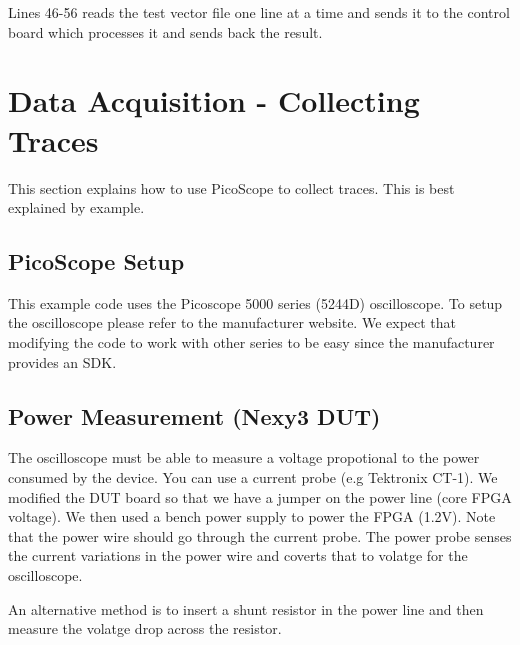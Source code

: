 \documentclass[letterpaper,10pt,english]{sphinxmanual}
\begin{document}
Lines 46-56 reads the test vector file one line at a time and sends it to the control board which processes it and sends back the result.


\chapter{Data Acquisition - Collecting Traces}
\label{\detokenize{capture_scope:data-acquisition-collecting-traces}}\label{\detokenize{capture_scope::doc}}
This section explains how to use PicoScope to collect traces. This is best explained by example.


\section{PicoScope Setup}
\label{\detokenize{capture_scope:picoscope-setup}}
This example code uses the Picoscope 5000 series (5244D) oscilloscope. To setup the oscilloscope please
refer to the manufacturer website.
We expect that modifying the code to work with other series to be easy since the manufacturer provides an SDK.


\section{Power Measurement (Nexy3 DUT)}
\label{\detokenize{capture_scope:power-measurement-nexy3-dut}}
The oscilloscope must be able to measure a voltage propotional to the power consumed by the device.
You can use a current probe (e.g Tektronix CT-1). We modified the DUT board so that we
have a jumper on the power line (core FPGA voltage).
We then used a bench power supply to power the FPGA (1.2V). Note that the power wire should go through the current probe.
The power probe senses the current variations in the power wire and coverts that to volatge for the oscilloscope.

An alternative method is to insert a shunt resistor in the power line and then measure the volatge drop
across the resistor.
\end{document}
